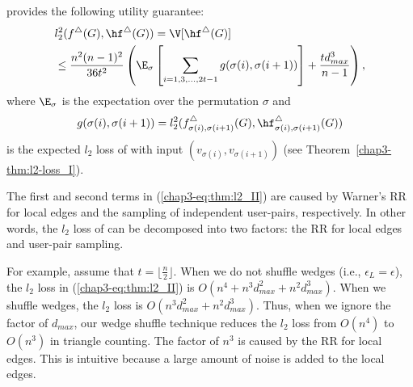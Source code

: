 \begin{theorem}
\label{chap3-thm:l2-loss_II}
\AlgWSTri{} provides the following utility guarantee:
\begin{align}
& l_2^2(f^\triangle(G), \hf^\triangle(G)) = \V[\hf^\triangle(G)] \nonumber\\ 
& \leq \frac{n^2(n-1)^2}{36t^2} \left(\E_\sigma \left[ \sum_{i=1, 3, \ldots, 2t-1} 
g(\sigma(i),\sigma(i+1)) \right] + \frac{t d_{max}^3}{n-1}\right), \label{chap3-eq:thm:l2_II}
\end{align}
where $\E_\sigma$ is the expectation over the permutation $\sigma$ and 
\begin{align}
g(\sigma(i),\sigma(i+1)) = l_2^2(f_{\sigma(i),\sigma(i+1)}^\triangle(G), \hf_{\sigma(i),\sigma(i+1)}^\triangle(G)) 
\label{chap3-eq:thm:g}
\end{align}
is the expected $l_2$ loss of \AlgWS{} with input $(v_{\sigma(i)},v_{\sigma(i+1)})$ (see Theorem~\ref{chap3-thm:l2-loss_I}). 
\end{theorem}

The first and second terms in (\ref{chap3-eq:thm:l2_II}) are caused by 
Warner's RR for local edges and the sampling of independent user-pairs, respectively. 
In other words, the $l_2$ loss of \AlgWSTri{} can be decomposed into two factors: the RR for local edges and user-pair sampling. 

For example, assume that $t = \lfloor \frac{n}{2} \rfloor$. 
When we do not shuffle wedges (i.e., $\epsilon_L = \epsilon$), the $l_2$ loss in (\ref{chap3-eq:thm:l2_II}) is $O(n^4 + n^3 d_{max}^2 + n^2 d_{max}^3)$. 
When we shuffle wedges, the $l_2$ loss is $O(n^3 d_{max}^2 + n^2 d_{max}^3)$. 
Thus, when we ignore the factor of $d_{max}$, our wedge shuffle technique reduces the $l_2$ loss from $O(n^4)$ to $O(n^3)$ in triangle counting. 
The factor of $n^3$ is caused by the RR for local edges. 
This is intuitive because a large amount of noise is added to the local edges. 

